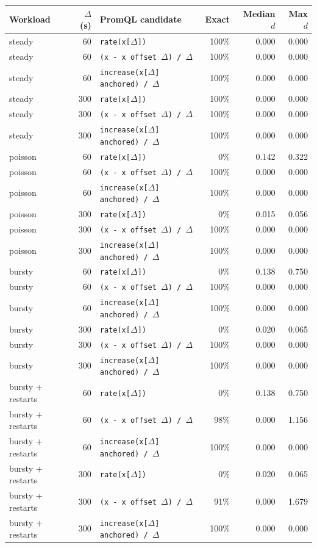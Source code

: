 \begin{tabular}{@{}lrlrrr@{}}
\toprule
Workload & $\Delta$ (s) & PromQL candidate & Exact & Median $d$ & Max $d$ \\
\midrule
steady & 60 & \texttt{rate(x[$\Delta$])} & 100\% & 0.000 & 0.000 \\
steady & 60 & \texttt{(x - x offset $\Delta$) / $\Delta$} & 100\% & 0.000 & 0.000 \\
steady & 60 & \texttt{increase(x[$\Delta$] anchored) / $\Delta$} & 100\% & 0.000 & 0.000 \\
steady & 300 & \texttt{rate(x[$\Delta$])} & 100\% & 0.000 & 0.000 \\
steady & 300 & \texttt{(x - x offset $\Delta$) / $\Delta$} & 100\% & 0.000 & 0.000 \\
steady & 300 & \texttt{increase(x[$\Delta$] anchored) / $\Delta$} & 100\% & 0.000 & 0.000 \\
poisson & 60 & \texttt{rate(x[$\Delta$])} & 0\% & 0.142 & 0.322 \\
poisson & 60 & \texttt{(x - x offset $\Delta$) / $\Delta$} & 100\% & 0.000 & 0.000 \\
poisson & 60 & \texttt{increase(x[$\Delta$] anchored) / $\Delta$} & 100\% & 0.000 & 0.000 \\
poisson & 300 & \texttt{rate(x[$\Delta$])} & 0\% & 0.015 & 0.056 \\
poisson & 300 & \texttt{(x - x offset $\Delta$) / $\Delta$} & 100\% & 0.000 & 0.000 \\
poisson & 300 & \texttt{increase(x[$\Delta$] anchored) / $\Delta$} & 100\% & 0.000 & 0.000 \\
bursty & 60 & \texttt{rate(x[$\Delta$])} & 0\% & 0.138 & 0.750 \\
bursty & 60 & \texttt{(x - x offset $\Delta$) / $\Delta$} & 100\% & 0.000 & 0.000 \\
bursty & 60 & \texttt{increase(x[$\Delta$] anchored) / $\Delta$} & 100\% & 0.000 & 0.000 \\
bursty & 300 & \texttt{rate(x[$\Delta$])} & 0\% & 0.020 & 0.065 \\
bursty & 300 & \texttt{(x - x offset $\Delta$) / $\Delta$} & 100\% & 0.000 & 0.000 \\
bursty & 300 & \texttt{increase(x[$\Delta$] anchored) / $\Delta$} & 100\% & 0.000 & 0.000 \\
bursty + restarts & 60 & \texttt{rate(x[$\Delta$])} & 0\% & 0.138 & 0.750 \\
bursty + restarts & 60 & \texttt{(x - x offset $\Delta$) / $\Delta$} & 98\% & 0.000 & 1.156 \\
bursty + restarts & 60 & \texttt{increase(x[$\Delta$] anchored) / $\Delta$} & 100\% & 0.000 & 0.000 \\
bursty + restarts & 300 & \texttt{rate(x[$\Delta$])} & 0\% & 0.020 & 0.065 \\
bursty + restarts & 300 & \texttt{(x - x offset $\Delta$) / $\Delta$} & 91\% & 0.000 & 1.679 \\
bursty + restarts & 300 & \texttt{increase(x[$\Delta$] anchored) / $\Delta$} & 100\% & 0.000 & 0.000 \\
\bottomrule
\end{tabular}
